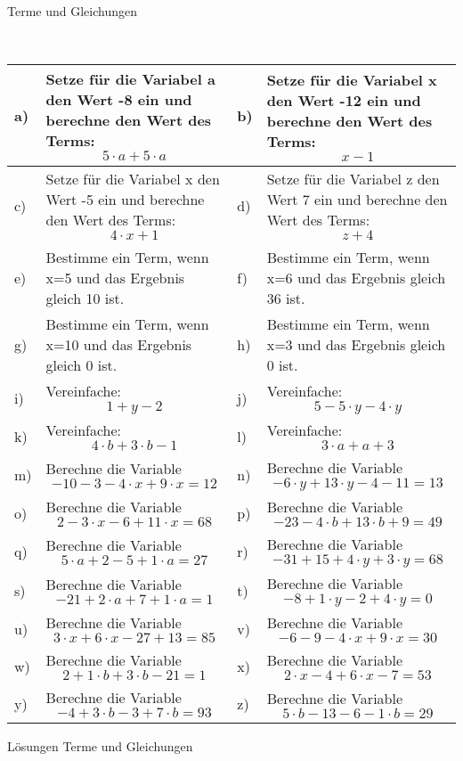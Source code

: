 \documentclass[12pt]{article}
\begin{document}
\centerline{{\Large Terme und Gleichungen}} 
\vspace{1cm}
\noindent \\


\begin{xltabular}{\textwidth}{|C{0.75cm}|X|C{0.75cm}|X|}
\hline
a)&Setze für die Variabel a den Wert -8 ein und berechne den Wert des Terms:$$5 \cdot a + 5 \cdot a$$
&
b)&Setze für die Variabel x den Wert -12 ein und berechne den Wert des Terms:$$x - 1$$
\\\hline
c)&Setze für die Variabel x den Wert -5 ein und berechne den Wert des Terms:$$4 \cdot x + 1$$
&
d)&Setze für die Variabel z den Wert 7 ein und berechne den Wert des Terms:$$z + 4$$
\\\hline
e)&Bestimme ein Term, wenn x=5 und das Ergebnis gleich 10 ist.
&
f)&Bestimme ein Term, wenn x=6 und das Ergebnis gleich 36 ist.
\\\hline
g)&Bestimme ein Term, wenn x=10 und das Ergebnis gleich 0 ist.
&
h)&Bestimme ein Term, wenn x=3 und das Ergebnis gleich 0 ist.
\\\hline
i)&Vereinfache:$$1 + y - 2$$
&
j)&Vereinfache:$$5 - 5 \cdot y - 4 \cdot y$$
\\\hline
k)&Vereinfache:$$4 \cdot b + 3 \cdot b - 1$$
&
l)&Vereinfache:$$3 \cdot a + a + 3$$
\\\hline
m)&Berechne die Variable $$-10-3-4\cdot x+9\cdot x=12$$
&
n)&Berechne die Variable $$-6\cdot y+13\cdot y-4-11=13$$
\\\hline
o)&Berechne die Variable $$2-3\cdot x-6+11\cdot x=68$$
&
p)&Berechne die Variable $$-23-4\cdot b+13\cdot b+9=49$$
\\\hline
q)&Berechne die Variable $$5\cdot a+2-5+1\cdot a=27$$
&
r)&Berechne die Variable $$-31+15+4\cdot y+3\cdot y=68$$
\\\hline
s)&Berechne die Variable $$-21+2\cdot a+7+1\cdot a=1$$
&
t)&Berechne die Variable $$-8+1\cdot y-2+4\cdot y=0$$
\\\hline
u)&Berechne die Variable $$3\cdot x+6\cdot x-27+13=85$$
&
v)&Berechne die Variable $$-6-9-4\cdot x+9\cdot x=30$$
\\\hline
w)&Berechne die Variable $$2+1\cdot b+3\cdot b-21=1$$
&
x)&Berechne die Variable $$2\cdot x-4+6\cdot x-7=53$$
\\\hline
y)&Berechne die Variable $$-4+3\cdot b-3+7\cdot b=93$$
&
z)&Berechne die Variable $$5\cdot b-13-6-1\cdot b=29$$
\\\hline
\end{xltabular}
\vspace{0.5cm}
\newpage
{}
\centerline{{\large Lösungen Terme und Gleichungen}} 
\vspace{0.5cm}
\end{document}
